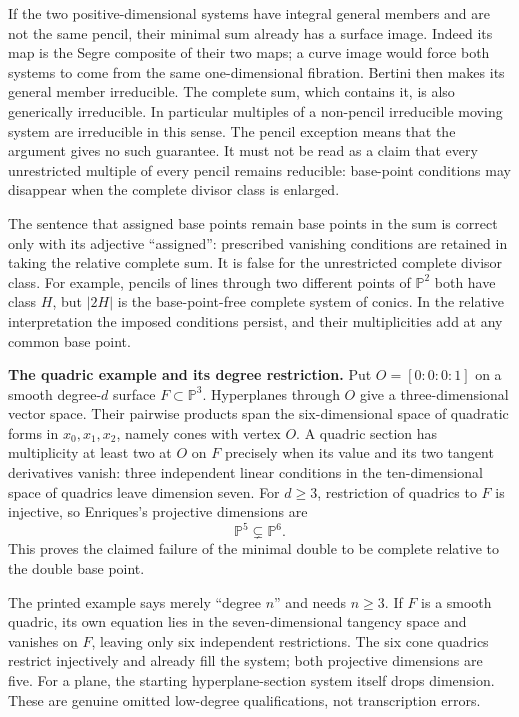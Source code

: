 If the two positive-dimensional systems have integral general members and are not the same pencil, their minimal sum already has a surface image. Indeed its map is the Segre composite of their two maps; a curve image would force both systems to come from the same one-dimensional fibration. Bertini then makes its general member irreducible. The complete sum, which contains it, is also generically irreducible. In particular multiples of a non-pencil irreducible moving system are irreducible in this sense. The pencil exception means that the argument gives no such guarantee. It must not be read as a claim that every unrestricted multiple of every pencil remains reducible: base-point conditions may disappear when the complete divisor class is enlarged.

The sentence that assigned base points remain base points in the sum is correct only with its adjective ``assigned'': prescribed vanishing conditions are retained in taking the relative complete sum. It is false for the unrestricted complete divisor class. For example, pencils of lines through two different points of \(\mathbb P^2\) both have class \(H\), but \(|2H|\) is the base-point-free complete system of conics. In the relative interpretation the imposed conditions persist, and their multiplicities add at any common base point.

\textbf{The quadric example and its degree restriction.} Put \(O=[0:0:0:1]\) on a smooth degree-\(d\) surface \(F\subset\mathbb P^3\). Hyperplanes through \(O\) give a three-dimensional vector space. Their pairwise products span the six-dimensional space of quadratic forms in \(x_0,x_1,x_2\), namely cones with vertex \(O\). A quadric section has multiplicity at least two at \(O\) on \(F\) precisely when its value and its two tangent derivatives vanish: three independent linear conditions in the ten-dimensional space of quadrics leave dimension seven. For \(d\ge3\), restriction of quadrics to \(F\) is injective, so Enriques's projective dimensions are \[
\mathbb P^5\subsetneq\mathbb P^6.
\] This proves the claimed failure of the minimal double to be complete relative to the double base point.

The printed example says merely ``degree \(n\)'' and needs \(n\ge3\). If \(F\) is a smooth quadric, its own equation lies in the seven-dimensional tangency space and vanishes on \(F\), leaving only six independent restrictions. The six cone quadrics restrict injectively and already fill the system; both projective dimensions are five. For a plane, the starting hyperplane-section system itself drops dimension. These are genuine omitted low-degree qualifications, not transcription errors.

